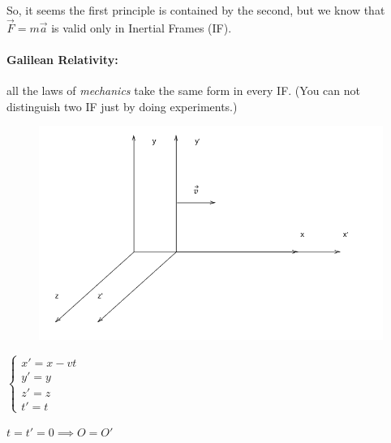 \documentclass{report}
\begin{document}
So, it seems the first principle is contained by the second, but we know that $\vec{F} = m \vec{a} $ is valid only in Inertial Frames (IF). \par
\paragraph{Galilean Relativity:} all the laws of \emph{mechanics} take the same form in every IF. (You can not distinguish two IF just by doing experiments.) \par
\begin{figure}
\begin{minipage}[t]{0.4\textwidth}
    \vspace*{0pt} 
    \centering
    \includegraphics[width=\linewidth]{imm/galileianboost.png} 
\end{minipage}

\end{figure}
\begin{minipage}[t]{0.4\textwidth}
    \vspace*{0pt}
    $
    \begin{cases}
    x' = x - vt \\
    y' = y \\
    z' = z \\
    t' = t
    \end{cases}$ \par
      $t = t' = 0 \implies O = O'$
\end{minipage} 
\bigskip
\end{document}

